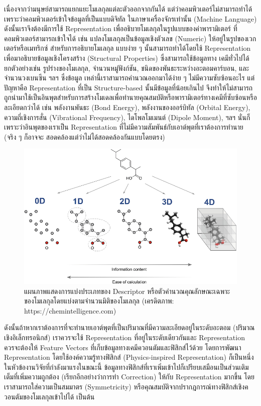 เนื่องจากว่ามนุษย์สามารถแยกแยะโมเลกุลแต่ละตัวออกจากกันได้ แต่ว่าคอมพิวเตอร์ไม่สามารถทำได้เพราะว่าคอมพิวเตอร์เข้าใจข้อมูลที่เป็นแบบดิจิทัล%
ในภาษาเครื่องจักรเท่านั้น (Machine Language) ดังนั้นเราจึงต้องมีการใช้ Representation เพื่ออธิบายโมเลกุลในรูปแบบของค่าพารามิเตอร์%
ที่คอมพิวเตอร์สามารถเข้าใจได้ เช่น แปลงโมเลกุลเป็นข้อมูลเชิงตัวเลข (Numeric) ให้อยู่ในรูปของเวกเตอร์หรือเมทริกซ์ สำหรับการอธิบายโมเลกุล%
แบบง่าย ๆ นั้นสามารถทำได้โดยใช้ Representation เพื่อมาอธิบายข้อมูลเชิงโครงสร้าง (Structural Properties) ซึ่งสามารถใช้ข้อมูลทาง%
เคมีทั่วไปได้ ยกตัวอย่างเช่น รูปร่างของโมเลกุล, จำนวนหมู่ฟังก์ชัน, ชนิดของพันธะระหว่างอะตอมคาร์บอน, และจำนวนวงเบนซีน ฯลฯ ซึ่งข้อมูล%
เหล่านี้เราสามารถคำนวณออกมาได้ง่าย ๆ ไม่มีความซับซ้อนอะไร แต่ปัญหาคือ Representation ที่เป็น Structure-based นั้นมีข้อมูลที่น้อยเกินไป
จึงทำให้ไม่สามารถถูกนำมาใช้เป็นอินพุตสำหรับการสร้างโมเดลเพื่อทำนายคุณสมบัติหรือพารามิเตอร์ทางเคมีที่ซับซ้อนหรือละเอียดกว่าได้ เช่น
พลังงานพันธะ (Bond Energy), พลังงานของออร์บิทัล (Orbital Energy), ความถี่เชิงการสั่น (Vibrational Frequency), ไดโพลโมเมนต์
(Dipole Moment), ฯลฯ นั่นก็เพราะว่าอินพุตของเราเป็น Representation ที่ไม่มีความสัมพันธ์กับเอาต์พุตที่เราต้องการทำนาย (จริง ๆ ก็อาจจะ%
สอดคล้องแต่ว่าไม่ได้สอดคล้องกันแบบโดยตรง)

\begin{figure}[htbp]
    \centering
    \includegraphics[width=\linewidth]{fig/descriptor_classes.png}
    \caption{แผนภาพแสดงการแบ่งประเภทของ Descriptor หรือตัวคำนวณคุณลักษณะเฉพาะของโมเลกุลโดยแบ่งตามจำนวนมิติของโมเลกุล
        (เครดิตภาพ: https://chemintelligence.com)}
    \label{fig:descriptor_classes}
\end{figure}

ดังนั้นถ้าหากเราต้องการที่จะทำนายเอาต์พุตที่เป็นปริมาณที่มีความละเอียดอยู่ในระดับอะตอม (ปริมาณเชิงอิเล็กทรอนิกส์) เราควรจะใช้ Representation
ที่อยู่ในระดับเดียวกันและ Representation ควรจะต้องให้ Feature Vectors ที่เก็บข้อมูลทางเคมีควอนตัมและฟิสิกส์ไว้ด้วย โดยการพัฒนา
Representation โดยใช้องค์ความรู้ทางฟิสิกส์ (Physics-inspired Representation) ก็เป็นหนึ่งในหัวข้องานวิจัยที่กำลังมาแรงในขณะนี้
ข้อมูลทางฟิสิกส์ที่เราเพิ่มเข้าไปก็เปรียบเสมือนเป็นส่วนเติมเต็มที่เพิ่มความถูกต้อง (เรียกอีกอย่างว่าการทำ Correction) ให้กับ Representation
มากขึ้น โดยเราสามารถใส่ความเป็นสมมาตร (Symmetricity) หรือคุณสมบัติจากปรากฎการณ์ทางฟิสิกส์เชิงควอนตัมของโมเลกุลเข้าไปได้ เป็นต้น


